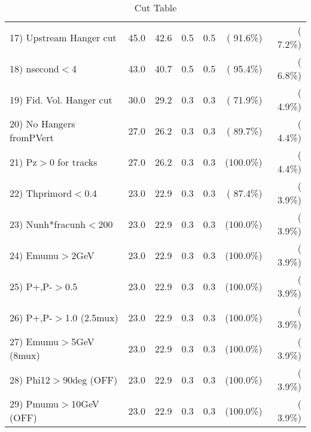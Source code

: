 \begin{table}[h!]
\begin{tabular}{||l||r|r|r|r|r|r||}
 17) Upstream Hanger cut  &         45.0 &         42.6 &          0.5 &          0.5 & ( 91.6\%) & (  7.2\%) \\
 18) nsecond$<$4          &         43.0 &         40.7 &          0.5 &          0.5 & ( 95.4\%) & (  6.8\%) \\
 19) Fid. Vol. Hanger cut &         30.0 &         29.2 &          0.3 &          0.3 & ( 71.9\%) & (  4.9\%) \\
 20) No Hangers fromPVert &         27.0 &         26.2 &          0.3 &          0.3 & ( 89.7\%) & (  4.4\%) \\
 21) Pz$>$0 for tracks    &         27.0 &         26.2 &          0.3 &          0.3 & (100.0\%) & (  4.4\%) \\
 22) Thprimord$<$0.4      &         23.0 &         22.9 &          0.3 &          0.3 & ( 87.4\%) & (  3.9\%) \\
 23) Nunh*fracunh$<$200   &         23.0 &         22.9 &          0.3 &          0.3 & (100.0\%) & (  3.9\%) \\
 24) Emumu$>$2GeV         &         23.0 &         22.9 &          0.3 &          0.3 & (100.0\%) & (  3.9\%) \\
 25) P+,P-$>$0.5          &         23.0 &         22.9 &          0.3 &          0.3 & (100.0\%) & (  3.9\%) \\
 26) P+,P-$>$1.0 (2.5mux) &         23.0 &         22.9 &          0.3 &          0.3 & (100.0\%) & (  3.9\%) \\
 27) Emumu$>$5GeV  (8mux) &         23.0 &         22.9 &          0.3 &          0.3 & (100.0\%) & (  3.9\%) \\
 28) Phi12$>$90deg  (OFF) &         23.0 &         22.9 &          0.3 &          0.3 & (100.0\%) & (  3.9\%) \\
 29) Pmumu$>$10GeV  (OFF) &         23.0 &         22.9 &          0.3 &          0.3 & (100.0\%) & (  3.9\%) \\
 \hline
 \hline
 \end{tabular}
 \caption{Cut Table           }
 \label{tab-cutcohjpsi-mumu_anuecc}
 \end{table}
